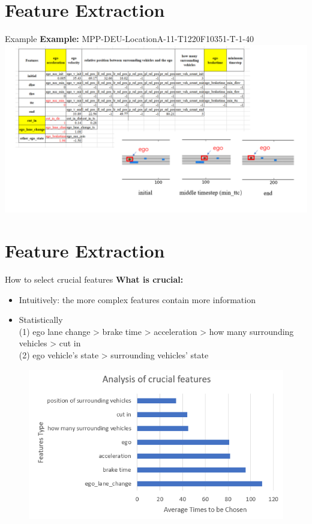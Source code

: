 \documentclass[shortpres]{beamer}
\begin{document}
\section{Feature Extraction}
\begin{frame}{Example}
	\textbf{Example:} MPP-DEU-LocationA-11-T1220F10351-T-1-40
    \includegraphics[height=0.75\textheight]{fig_FeatureExtraction/CrucialFeatureExplanation.png}
\end{frame}

\section{Feature Extraction}
\begin{frame}{How to select crucial features}
\textbf{What is crucial: }
\begin{itemize} 
	\item Intuitively: the more complex features contain more information
	
	\vfill \item Statistically\\
	(1) ego lane change > brake time > acceleration > how many surrounding vehicles > cut in\\
	(2) ego vehicle’s state > surrounding vehicles’ state
\end{itemize}
\begin{figure}
	\includegraphics[height=0.5\textheight]{fig_FeatureExtraction/analysis_crucial_features.png} 
\end{figure}
\end{frame}
\end{document}
